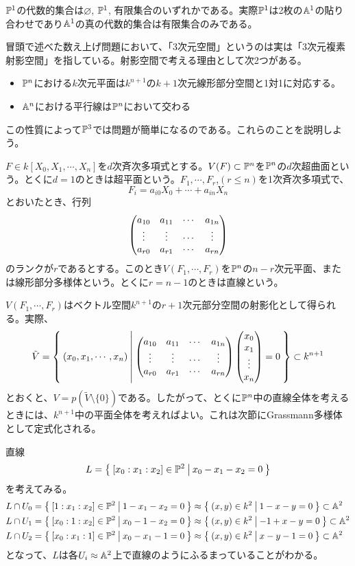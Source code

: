 \documentclass{ltjsreport}
\begin{document}
\begin{eg}
  $\mathbb{P}^1$の代数的集合は$\varnothing$, $\mathbb{P}^1$, 有限集合のいずれかである。実際$\mathbb{P}^1$は2枚の$\mathbb{A}^1$の貼り合わせであり$\mathbb{A}^1$の真の代数的集合は有限集合のみである。
\end{eg}


冒頭で述べた数え上げ問題において、「3次元空間」というのは実は「3次元複素射影空間」を指している。射影空間で考える理由として次2つがある。
\begin{itemize}
  \item $\mathbb{P}^n$における$k$次元平面は$k^{n+1}$の$k+1$次元線形部分空間と1対1に対応する。
  \item $\mathbb{A}^n$における平行線は$\mathbb{P}^n$において交わる
\end{itemize}
この性質によって$\mathbb{P}^3$では問題が簡単になるのである。これらのことを説明しよう。

\begin{defin}
  $F\in k[X_0,X_1,\cdots,X_n]$を$d$次斉次多項式とする。$V(F)\subset\mathbb{P}^n$を$\mathbb{P}^n$の$d$次超曲面という。とくに$d=1$のときは超平面という。$F_1,\cdots,F_r$,$(r\leq n)$を1次斉次多項式で、
  \[
  F_i=a_{i0}X_0+\cdots+a_{in}X_n
  \]
  とおいたとき、行列
  \[
  \begin{pmatrix} 
    a_{10} & a_{11} & \cdots & a_{1n}\\
    \vdots & \vdots & \cdots & \vdots \\
    a_{r0} & a_{r1} & \cdots & a_{rn}
   \end{pmatrix} 
  \]
  のランクが$r$であるとする。このとき$V(F_1,\cdots,F_r)$を$\mathbb{P}^n$の$n-r$次元平面、または線形部分多様体という。とくに$r=n-1$のときは直線という。
\end{defin}

$V(F_1,\cdots,F_r)$はベクトル空間$k^{n+1}$の$r+1$次元部分空間の射影化として得られる。実際、
\[
\tilde{V}=\left\{\:(x_0,x_1,\cdots,x_n)\:\middle|\:\begin{pmatrix} 
    a_{10} & a_{11} & \cdots & a_{1n}\\
    \vdots & \vdots & \cdots & \vdots \\
    a_{r0} & a_{r1} & \cdots & a_{rn}
 \end{pmatrix}\begin{pmatrix} x_0\\x_1\\\vdots\\x_n \end{pmatrix}=0\:\right\}\subset k^{n+1}
\]
とおくと、$V=p(\tilde{V}\setminus\{0\})$である。したがって、とくに$\mathbb{P}^n$中の直線全体を考えるときには、$k^{n+1}$中の平面全体を考えればよい。これは次節にGrassmann多様体として定式化される。

\begin{eg}
  直線
  \[
  L=\left\{\:[x_0:x_1:x_2]\in\mathbb{P}^2\:\middle|\:x_0-x_1-x_2=0\:\right\}  
  \]
  を考えてみる。
  \begin{align*}
  &L\cap U_0=\left\{\:[1:x_1:x_2]\in\mathbb{P}^2\:\middle|\:1-x_1-x_2=0\:\right\} \approx \left\{\:(x,y)\in k^2\:\middle|\:1-x-y=0\:\right\}\subset \mathbb{A}^2\\
  &L\cap U_1=\left\{\:[x_0:1:x_2]\in\mathbb{P}^2\:\middle|\:x_0-1-x_2=0\:\right\}
  \approx \left\{\:(x,y)\in k^2\:\middle|\:-1+x-y=0\:\right\}\subset \mathbb{A}^2\\
  &L\cap U_2=\left\{\:[x_0:x_1:1]\in\mathbb{P}^2\:\middle|\:x_0-x_1-1=0\:\right\}
  \approx \left\{\:(x,y)\in k^2\:\middle|\:x-y-1=0\:\right\}\subset \mathbb{A}^2
  \end{align*}
  となって、$L$は各$U_i\approx \mathbb{A}^2$上で直線のようにふるまっていることがわかる。
\end{eg}
\end{document}
